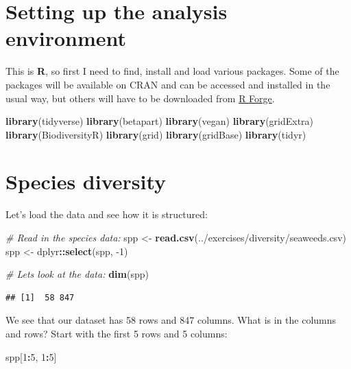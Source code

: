 \documentclass[10pt,a4,]{article}
\newenvironment{Shaded}{\begin{snugshade}}{\end{snugshade}}
\newcommand{\CommentTok}[1]{\textcolor[rgb]{0.56,0.35,0.01}{\textit{#1}}}
\newcommand{\DecValTok}[1]{\textcolor[rgb]{0.00,0.00,0.81}{#1}}
\newcommand{\KeywordTok}[1]{\textcolor[rgb]{0.13,0.29,0.53}{\textbf{#1}}}
\newcommand{\NormalTok}[1]{#1}
\newcommand{\OperatorTok}[1]{\textcolor[rgb]{0.81,0.36,0.00}{\textbf{#1}}}
\newcommand{\StringTok}[1]{\textcolor[rgb]{0.31,0.60,0.02}{#1}}
\begin{document}
\section{Setting up the analysis environment}

This is \textbf{R}, so first I need to find, install and load various
packages. Some of the packages will be available on CRAN and can be
accessed and installed in the usual way, but others will have to be
downloaded from \href{https://r-forge.r-project.org/R/?group_id=195}{R
Forge}.

\begin{Shaded}
\begin{Highlighting}[]
\KeywordTok{library}\NormalTok{(tidyverse)}
\KeywordTok{library}\NormalTok{(betapart)}
\KeywordTok{library}\NormalTok{(vegan)}
\KeywordTok{library}\NormalTok{(gridExtra)}
\KeywordTok{library}\NormalTok{(BiodiversityR)}
\KeywordTok{library}\NormalTok{(grid)}
\KeywordTok{library}\NormalTok{(gridBase)}
\KeywordTok{library}\NormalTok{(tidyr)}
\end{Highlighting}
\end{Shaded}

\section{Species diversity}

Let's load the data and see how it is structured:

\begin{Shaded}
\begin{Highlighting}[]
\CommentTok{\# Read in the species data:}
\NormalTok{spp <{-}}\StringTok{ }\KeywordTok{read.csv}\NormalTok{(}\StringTok{\textquotesingle{}../exercises/diversity/seaweeds.csv\textquotesingle{}}\NormalTok{)}
\NormalTok{spp <{-}}\StringTok{ }\NormalTok{dplyr}\OperatorTok{::}\KeywordTok{select}\NormalTok{(spp, }\DecValTok{{-}1}\NormalTok{)}

\CommentTok{\# Lets look at the data:}
\KeywordTok{dim}\NormalTok{(spp)}
\end{Highlighting}
\end{Shaded}

\begin{verbatim}
## [1]  58 847
\end{verbatim}

We see that our dataset has 58 rows and 847 columns. What is in the
columns and rows? Start with the first 5 rows and 5 columns:

\begin{Shaded}
\begin{Highlighting}[]
\NormalTok{spp[}\DecValTok{1}\OperatorTok{:}\DecValTok{5}\NormalTok{, }\DecValTok{1}\OperatorTok{:}\DecValTok{5}\NormalTok{]}
\end{Highlighting}
\end{Shaded}
\end{document}
